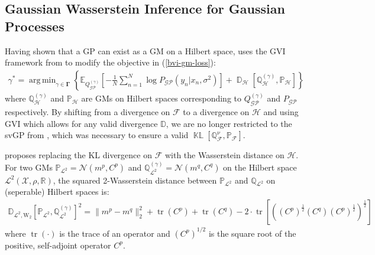 \documentclass{article}
\newcommand{\KLD}{\operatorname{\mathbb{KL}}}
\newcommand{\D}{\operatorname{\mathbb{D}}}
\newcommand{\tr}{\operatorname{tr}}
\newcommand{\GP}{\operatorname{\mathcal{GP}}}
\DeclareMathOperator*{\argmin}{arg\,min}
\numberwithin{equation}{section}
\begin{document}
\subsection{Gaussian Wasserstein Inference for Gaussian Processes}
Having shown that a GP can exist as a GM on a Hilbert space, \cite{wild2022generalized} uses the GVI framework from \cite{knoblauch2022optimization} to modify the objective in (\ref{bvi-gm-loss}):
\begin{align}
    \label{gwi-objective}
    \gamma^* = \argmin_{\gamma \in \boldsymbol{\Gamma}}\left\{ \mathbb{E}_{Q^{(\gamma)}_{\GP}}\left[- \frac{1}{N}\sum_{n=1}^N \log P_{\GP}\left(y_n \vert x_n, \sigma^2\right) \right] + \D_{\mathcal{H}} \left[\mathbb{Q}^{(\gamma)}_{\mathcal{H}}, \mathbb{P}_{\mathcal{H}} \right]\right\}
\end{align}
where $\mathbb{Q}^{(\gamma)}_{\mathcal{H}}$ and $\mathbb{P}_{\mathcal{H}}$ are GMs on Hilbert spaces corresponding to $Q^{(\gamma)}_{\GP}$ and $P_{\GP}$ respectively. By shifting from a divergence on $\mathcal{F}$ to a divergence on $\mathcal{H}$ and using GVI which allows for any valid divergence $\mathbb{D}$, we are no longer restricted to the svGP from \cite{titsias2009variational}, which was necessary to ensure a valid $\KLD\left[\mathbb{Q}^{\nu}_{\mathcal{F}},  \mathbb{P}_{\mathcal{F}}\right]$. 

\cite{wild2022generalized} proposes replacing the KL divergence on $\mathcal{F}$ with the Wasserstein distance on $\mathcal{H}$. For two GMs $\mathbb{P}_{\mathcal{L}^2} = \mathcal{N}(m^p, C^p)$ and $\mathbb{Q}^{(\gamma)}_{\mathcal{L}^2} = \mathcal{N}(m^q, C^q)$ on the Hilbert space $\mathcal{L}^2(\mathcal{X}, \rho, \mathbb{R})$, the squared 2-Wasserstein distance between $\mathbb{P}_{\mathcal{L}^2}$ and $\mathbb{Q}_{\mathcal{L}^2}$ on (seperable) Hilbert spaces is:
\begin{align}
    \mathbb{D}_{\mathcal{L}^2, \text{W}_2} \left[\mathbb{P}_{\mathcal{L}^2}, \mathbb{Q}^{(\gamma)}_{\mathcal{L}^2}\right]^2 = \| m^p - m^q\|_2^2 + \tr(C^p) + \tr(C^q) - 2 \cdot \tr \left[ \left( \left(C^p\right)^{\frac{1}{2}} \left(C^q\right) \left(C^p\right)^{\frac{1}{2}}\right)^{\frac{1}{2}}\right]
\end{align}
where $\tr(\cdot)$ is the trace of an operator and $\left(C^p\right)^{1/2}$ is the square root of the positive, self-adjoint operator $C^p$. 
\end{document}
